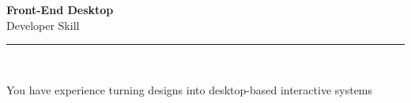 \documentclass[11pt,a4paper]{memoir}
\begin{document}
    \begin{Spacing}{0.75}%
        \noindent
        \Large
        \textbf{Front-End Desktop}\\[3pt]
        \scriptsize\color{gray}Developer Skill\\ 
        \rule{\textwidth}{.3mm}\\
        
        \vspace{3mm}
        \noindent
        \begin{minipage}[t]{53mm}
            \begin{flushleft}
            {
                \normalsize
                \begin{Spacing}{1}%
                \color{black}\textrm{You have experience turning designs into desktop-based interactive systems}\\
                \end{Spacing}
            }
            \end{flushleft}
        \end{minipage}

        \vspace{5mm}
        \noindent
        \begin{minipage}[t]{53mm}
            \begin{flushleft}
            {
                \normalsize
                \begin{Spacing}{1}%
                \color{gray}\textit{}\\
                \end{Spacing}
            }
            \end{flushleft}
        \end{minipage}
    \end{Spacing}
    \clearpage
\end{document}
